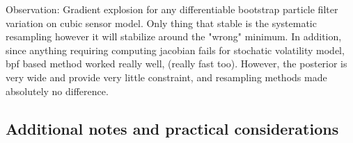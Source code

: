 \documentclass{article}
\begin{document}






Observation: Gradient explosion for any differentiable bootstrap particle filter variation on cubic sensor model. Only thing that stable is the systematic resampling however it will stabilize around the "wrong" minimum. In addition, since anything requiring computing jacobian fails for stochatic volatility model, bpf based method worked really well,  (really fast too). However, the posterior is very wide and provide very little constraint, and resampling methods made absolutely no difference. 


\subsection{Additional notes and practical considerations}
\end{document}
